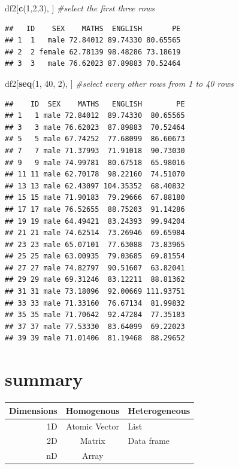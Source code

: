 \documentclass[]{book}
\newenvironment{Shaded}{\begin{snugshade}}{\end{snugshade}}
\newcommand{\KeywordTok}[1]{\textcolor[rgb]{0.13,0.29,0.53}{\textbf{#1}}}
\newcommand{\DecValTok}[1]{\textcolor[rgb]{0.00,0.00,0.81}{#1}}
\newcommand{\CommentTok}[1]{\textcolor[rgb]{0.56,0.35,0.01}{\textit{#1}}}
\newcommand{\NormalTok}[1]{#1}
\begin{document}
\begin{Shaded}
\begin{Highlighting}[]
\NormalTok{df2[}\KeywordTok{c}\NormalTok{(}\DecValTok{1}\NormalTok{,}\DecValTok{2}\NormalTok{,}\DecValTok{3}\NormalTok{), ] }\CommentTok{#select the first three rows}
\end{Highlighting}
\end{Shaded}

\begin{verbatim}
##   ID    SEX    MATHS  ENGLISH       PE
## 1  1   male 72.84012 89.74330 80.65565
## 2  2 female 62.78139 98.48286 73.18619
## 3  3   male 76.62023 87.89883 70.52464
\end{verbatim}

\begin{Shaded}
\begin{Highlighting}[]
\NormalTok{df2[}\KeywordTok{seq}\NormalTok{(}\DecValTok{1}\NormalTok{, }\DecValTok{40}\NormalTok{, }\DecValTok{2}\NormalTok{), ] }\CommentTok{#select every other rows from 1 to 40 rows }
\end{Highlighting}
\end{Shaded}

\begin{verbatim}
##    ID  SEX    MATHS   ENGLISH        PE
## 1   1 male 72.84012  89.74330  80.65565
## 3   3 male 76.62023  87.89883  70.52464
## 5   5 male 67.74252  77.68099  86.60673
## 7   7 male 71.37993  71.91018  90.73030
## 9   9 male 74.99781  80.67518  65.98016
## 11 11 male 62.70178  98.22160  74.51070
## 13 13 male 62.43097 104.35352  68.40832
## 15 15 male 71.90183  79.29666  67.88180
## 17 17 male 76.52655  88.75203  91.14286
## 19 19 male 64.49421  83.24393  99.94204
## 21 21 male 74.62514  73.26946  69.65984
## 23 23 male 65.07101  77.63088  73.83965
## 25 25 male 63.00935  79.03685  69.81554
## 27 27 male 74.82797  90.51607  63.82041
## 29 29 male 69.31246  83.12211  88.81362
## 31 31 male 73.18096  92.00669 111.93751
## 33 33 male 71.33160  76.67134  81.99832
## 35 35 male 71.70642  92.47284  77.35183
## 37 37 male 77.53330  83.64099  69.22023
## 39 39 male 71.01406  81.19468  88.29652
\end{verbatim}

\section{summary}\label{summary}

\begin{longtable}[]{@{}rcl@{}}
\toprule
Dimensions & Homogenous & Heterogeneous\tabularnewline
\midrule
\endhead
1D & Atomic Vector & List\tabularnewline
2D & Matrix & Data frame\tabularnewline
nD & Array &\tabularnewline
\bottomrule
\end{longtable}
\end{document}

